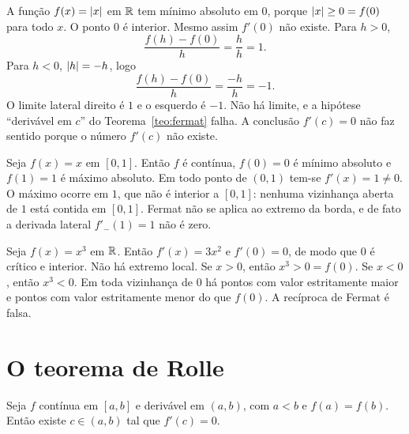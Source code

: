 \documentclass[11pt,a4paper]{article}
\begin{document}
\begin{contraexemplo}
A função $f(x)=\left\lvert x \right\rvert$ em $\mathbb{R}$ tem mínimo absoluto em $0$, porque $\left\lvert x \right\rvert\ge 0=f(0)$ para todo $x$. O ponto $0$ é interior. Mesmo assim $f'(0)$ não existe. Para $h>0$,
\[
\frac{f(h)-f(0)}{h}=\frac{h}{h}=1.
\]
Para $h<0$, $\left\lvert h \right\rvert=-h$, logo
\[
\frac{f(h)-f(0)}{h}=\frac{-h}{h}=-1.
\]
O limite lateral direito é $1$ e o esquerdo é $-1$. Não há limite, e a hipótese ``derivável em $c$'' do Teorema~\ref{teo:fermat} falha. A conclusão $f'(c)=0$ não faz sentido porque o número $f'(c)$ não existe.
\end{contraexemplo}

\begin{contraexemplo}
Seja $f(x)=x$ em $[0,1]$. Então $f$ é contínua, $f(0)=0$ é mínimo absoluto e $f(1)=1$ é máximo absoluto. Em todo ponto de $(0,1)$ tem-se $f'(x)=1\neq 0$. O máximo ocorre em $1$, que não é interior a $[0,1]$: nenhuma vizinhança aberta de $1$ está contida em $[0,1]$. Fermat não se aplica ao extremo da borda, e de fato a derivada lateral $f'_-(1)=1$ não é zero.
\end{contraexemplo}

\begin{contraexemplo}
Seja $f(x)=x^3$ em $\mathbb{R}$. Então $f'(x)=3x^2$ e $f'(0)=0$, de modo que $0$ é crítico e interior. Não há extremo local. Se $x>0$, então $x^3>0=f(0)$. Se $x<0$, então $x^3<0$. Em toda vizinhança de $0$ há pontos com valor estritamente maior e pontos com valor estritamente menor do que $f(0)$. A recíproca de Fermat é falsa.
\end{contraexemplo}


\section{O teorema de Rolle}

\begin{teorema}[Rolle]\label{teo:rolle}
Seja $f$ contínua em $[a,b]$ e derivável em $(a,b)$, com $a<b$ e $f(a)=f(b)$. Então existe $c\in(a,b)$ tal que $f'(c)=0$.
\end{teorema}
\end{document}

